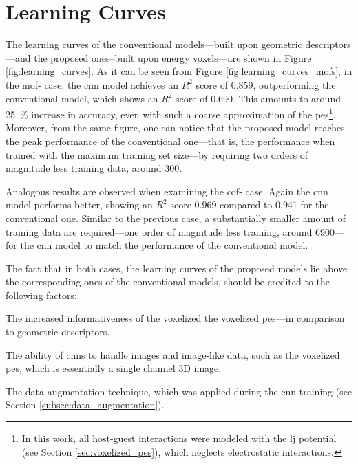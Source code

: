 \section{Learning Curves}

The learning curves of the conventional models---built
upon geometric descriptors---and the proposed ones--built upon energy
voxels---are shown in Figure \ref{fig:learning_curves}. As it can be seen from
Figure \ref{fig:learning_curves_mofs}, in the \gls{mof}- case, the
\gls{cnn} model achieves an $R^2$ score of \num{0.859}, outperforming the
conventional model, which shows an $R^2$ score of \num{0.690}. This amounts to
around \SI{25}{\percent} increase in accuracy, even with such a coarse
approximation of the \gls{pes}\footnote{In this work, all host-guest
interactions were modeled with the \gls{lj} potential (see Section
\ref{sec:voxelized_pes}), which neglects electrostatic interactions.}. Moreover,
from the same figure, one can notice that the proposed model reaches the peak
performance of the conventional one---that is, the performance when trained with
the maximum training set size---by requiring two orders of magnitude less
training data, around \num{300}.

Analogous results are observed when examining the \gls{cof}- case. Again
the \gls{cnn} model performs better, showing an $R^2$ score \num{0.969} compared
to \num{0.941} for the conventional one. Similar to the previous case, a
substantially smaller amount of training data are required---one order of
magnitude less training, around \num{6900}---for the \gls{cnn} model to match
the performance of the conventional model.

The fact that in both cases, the learning curves of the proposed models lie
above the corresponding ones of the conventional models, should be credited to
the following factors:
\begin{enumerate*}[label=\roman*).]
	\item The increased informativeness of the voxelized the voxelized
		\gls{pes}---in comparison to geometric descriptors.
	\item The ability of \glspl{cnn} to handle images and image-like
		data, such as the voxelized \gls{pes}, which is
		essentially a single channel 3D image.
	\item The data augmentation technique, which was
		applied during the \gls{cnn} training (see Section
		\ref{subsec:data_augmentation}).
\end{enumerate*}

